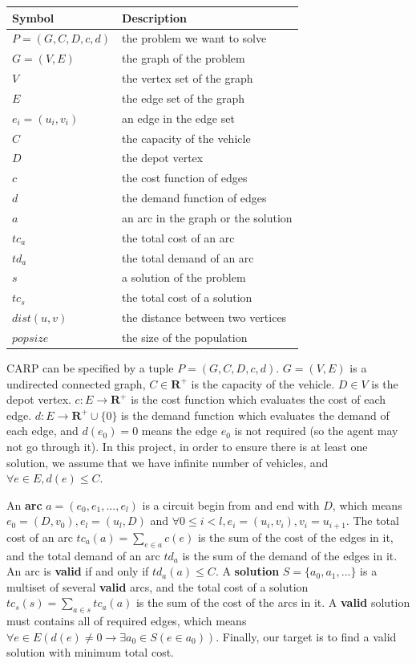 \documentclass[lettersize,journal]{IEEEtran}
\begin{document}
\begin{center}
    \begin{tabular}{l|l}
        Symbol & Description \\ \hline\hline
        $P=(G,C,D,c,d)$ & the problem we want to solve \\
        $G=(V,E)$ & the graph of the problem \\
        $V$ & the vertex set of the graph \\
        $E$ & the edge set of the graph \\
        $e_i=(u_i,v_i)$ & an edge in the edge set \\
        $C$ & the capacity of the vehicle \\
        $D$ & the depot vertex \\
        $c$ & the cost function of edges \\
        $d$ & the demand function of edges \\
        $a$ & an arc in the graph or the solution \\
        $tc_a$ & the total cost of an arc \\
        $td_a$ & the total demand of an arc \\
        $s$ & a solution of the problem \\
        $tc_s$ & the total cost of a solution \\
        $dist(u,v)$ & the distance between two vertices \\
        $popsize$ & the size of the population \\
    \end{tabular}
\end{center}

CARP can be specified by a tuple $P=(G,C,D,c,d)$. $G=(V,E)$ is a undirected connected graph, $C\in\mathbf{R}^+$ is the capacity of the vehicle. $D\in V$ is the depot vertex. $c:E\to\mathbf{R}^+$ is the cost function which evaluates the cost of each edge. $d:E\to\mathbf{R}^+\cup\{0\}$ is the demand function which evaluates the demand of each edge, and $d(e_0)=0$ means the edge $e_0$ is not required (so the agent may not go through it). In this project, in order to ensure there is at least one solution, we assume that we have infinite number of vehicles, and $\forall e\in E,d(e)\leq C$.

An \textbf{arc} $a=(e_0,e_1,...,e_l)$ is a circuit begin from and end with $D$, which means $e_0=(D,v_0),e_l=(u_l,D)$ and $\forall0\leq i<l,e_i=(u_i,v_i),v_i=u_{i+1}$. The total cost of an arc $tc_a(a)=\sum_{e\in a}c(e)$ is the sum of the cost of the edges in it, and the total demand of an arc $td_a$ is the sum of the demand of the edges in it. An arc is \textbf{valid} if and only if $td_a(a)\leq C$. A \textbf{solution} $S=\{a_0,a_1,...\}$ is a multiset of several \textbf{valid} arcs, and the total cost of a solution $tc_s(s)=\sum_{a\in s}tc_a(a)$ is the sum of the cost of the arcs in it. A \textbf{valid} solution must contains all of required edges, which means $\forall e\in E(d(e)\not=0\to\exists a_0\in S(e\in a_0))$. Finally, our target is to find a valid solution with minimum total cost.
\end{document}
